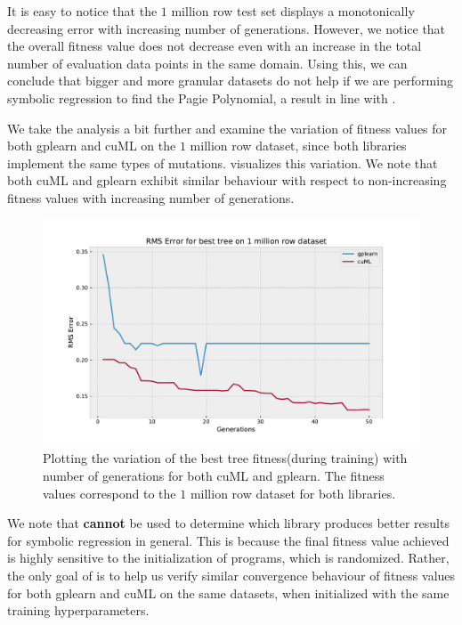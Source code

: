 It is easy to notice that the $1$ million row test set displays a monotonically decreasing error with increasing number of generations. However, we notice that the overall fitness value does not decrease even with an increase in the total number of evaluation data points in the same domain. Using this, we can conclude that bigger and more granular datasets do not help if we are performing symbolic regression to find the Pagie Polynomial, a result in line with \citep{baeta2021speed}.

We take the analysis a bit further and examine the variation of fitness values for both gplearn and cuML on the $1$ million row dataset, since both libraries implement the same types of mutations.  visualizes this variation. We note that both cuML and gplearn exhibit similar behaviour with respect to non-increasing fitness values with increasing number of generations. 

\begin{figure}[ht]
  \centering
  \includegraphics[scale=0.59]{images/RMSErrorGPLEARN.pdf}
  \caption{Plotting the variation of the best tree fitness(during training) with number of generations for both cuML and gplearn. The fitness values correspond to the $1$ million row dataset for both libraries.}
  \label{fig:gplearnvscuML1mil}
\end{figure}

We note that  \textbf{cannot} be used to determine which library produces better results for symbolic regression in general. This is because the final fitness value achieved is highly sensitive to the initialization of programs, which is randomized. Rather, the only goal of  is to help us verify similar convergence behaviour of fitness values for both gplearn and cuML on the same datasets, when initialized with the same training hyperparameters.

